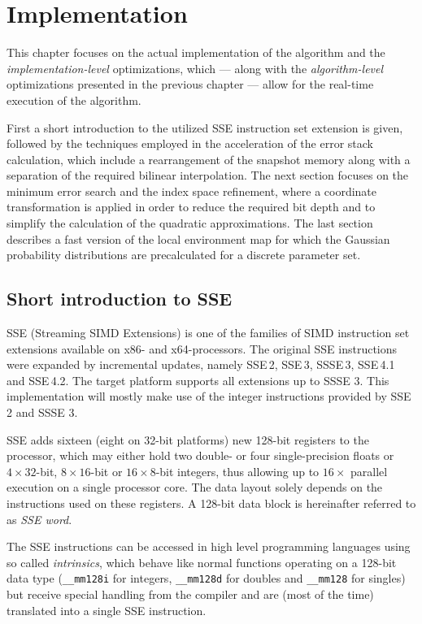\chapter{Implementation}

This chapter focuses on the actual implementation of the algorithm and the \textit{implementation-level} optimizations, which --- along with the \textit{algorithm-level} optimizations presented in the previous chapter --- allow for the real-time execution of the algorithm.

First a short introduction to the utilized SSE instruction set extension is given, followed by the techniques employed in the acceleration of the error stack calculation, which include a rearrangement of the snapshot memory along with a separation of the required bilinear interpolation. The next section focuses on the minimum error search and the index space refinement, where a coordinate transformation is applied in order to reduce the required bit depth and to simplify the calculation of the quadratic approximations. The last section describes a fast version of the local environment map for which the Gaussian probability distributions are precalculated for a discrete parameter set.

\section{Short introduction to SSE}

SSE (Streaming SIMD Extensions) is one of the families of SIMD instruction set extensions available on x86- and x64-processors. The original SSE instructions were expanded by incremental updates, namely SSE\,2, SSE\,3, SSSE\,3, SSE\,4.1 and SSE\,4.2. The target platform supports all extensions up to SSSE 3. This implementation will mostly make use of the integer instructions provided by SSE 2 and SSSE 3.

SSE adds sixteen (eight on 32-bit platforms) new 128-bit registers to the processor, which may either hold two double- or four single-precision floats or $4 \times 32$-bit, $8 \times 16$-bit or $16 \times 8$-bit integers, thus allowing up to $16 \times$ parallel execution on a single processor core. The data layout solely depends on the instructions used on these registers. A 128-bit data block is hereinafter referred to as \textit{SSE word}.

The SSE instructions can be accessed in high level programming languages using so called \textit{intrinsics}, which behave like normal functions operating on a 128-bit data type (\texttt{\_\_mm128i} for integers, \texttt{\_\_mm128d} for doubles and \texttt{\_\_mm128} for singles) but receive special handling from the compiler and are (most of the time) translated into a single SSE instruction.

